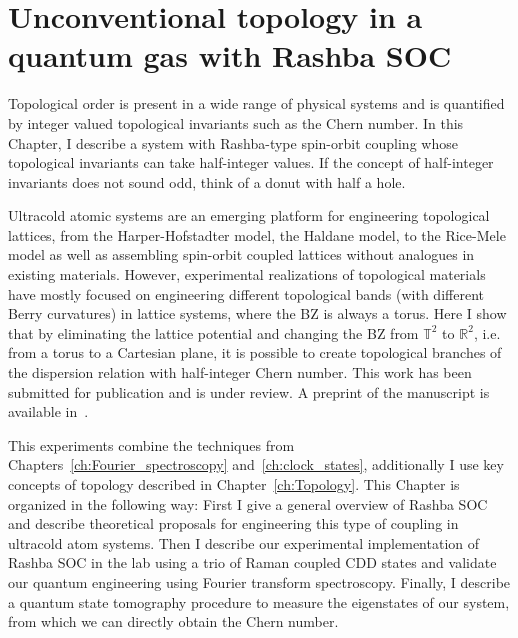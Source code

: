 
\renewcommand{\thechapter}{8}

\chapter{Unconventional topology in a quantum gas with Rashba SOC}
\label{ch:Rashba}

Topological order is present in a wide range of physical systems and is quantified by integer valued topological invariants such as the Chern number. In this Chapter, I describe a system with Rashba-type spin-orbit coupling whose topological invariants can take half-integer values. If the concept of half-integer invariants does not sound odd, think of a donut with half a hole. 

Ultracold atomic systems are an emerging platform for engineering topological lattices, from the Harper-Hofstadter model\cite{miyake_realizing_2013,aidelsburger_realization_2013}, the Haldane model\cite{jotzu_experimental_2014}, to the Rice-Mele model\cite{lu_geometrical_2016,lohse_thouless_2016} as well as assembling spin-orbit coupled lattices without analogues in existing materials\cite{wu_realization_2016,sun_highly_2018}. However, experimental realizations of topological materials have mostly focused on engineering different topological bands (with different Berry curvatures) in lattice systems, where the BZ is always a torus. Here I show that by eliminating the lattice potential and changing the BZ from ${\mathbb T}^2$ to ${\mathbb R}^2$, i.e. from a torus to a Cartesian plane, it is possible to create topological branches of the dispersion relation with half-integer Chern number. This work has been submitted for publication and is under review. A preprint of the manuscript is available in~\cite{valdes-curiel_unconventional_2019}. %

This experiments combine the techniques from Chapters~\ref{ch:Fourier_spectroscopy} and~\ref{ch:clock_states}, additionally I use key concepts of topology described in Chapter~\ref{ch:Topology}. This Chapter is organized in the following way: First I give a general overview of Rashba SOC and describe theoretical proposals for engineering this type of coupling in ultracold atom systems. Then I describe our experimental implementation of Rashba SOC in the lab using a trio of Raman coupled CDD states and validate our quantum engineering using Fourier transform spectroscopy. Finally, I describe a quantum state tomography procedure to measure the eigenstates of our system, from which we can directly obtain the Chern number. 

